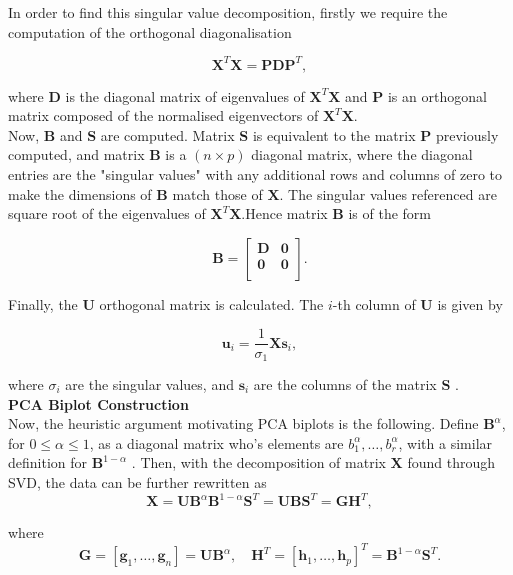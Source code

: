 \documentclass{article}\usepackage[]{graphicx}\usepackage[]{xcolor}
\numberwithin{equation}{section}
\begin{document}
\noindent In order to find this singular value decomposition, firstly we require the computation of the orthogonal diagonalisation  

\[
\mathbf{X}^T\mathbf{X}=\mathbf{PDP}^T,
\] 

\noindent where $\mathbf{D}$ is the diagonal matrix of eigenvalues of $\mathbf{X}^T\mathbf{X}$ and $\mathbf{P}$ is an orthogonal matrix composed of the normalised eigenvectors of $\mathbf{X}^T\mathbf{X}$.\\

\noindent Now, $\mathbf{B}$ and $\mathbf{S}$ are computed. Matrix $\mathbf{S}$ is equivalent to the matrix $\mathbf{P}$ previously computed, and matrix $\mathbf{B}$ is a $(n \times p)$ diagonal matrix, where the diagonal entries are the "singular values" with any additional rows and columns of zero to make the dimensions of $\mathbf{B}$ match those of $\mathbf{X}$. The singular values referenced are square root of the eigenvalues of $\mathbf{X}^T\mathbf{X}$.Hence matrix $\mathbf{B}$ is of the form

\[
\mathbf{B} = 
\begin{bmatrix}
    \mathbf{D} & \mathbf{0} \\
    \mathbf{0} & \mathbf{0} \\
\end{bmatrix}.
\]

\noindent Finally, the $\mathbf{U}$ orthogonal matrix is calculated. The $i$-th column of $\mathbf{U}$ is given by

\[
\mathbf{u}_i = \frac{1}{\sigma_1}\mathbf{X}\mathbf{s}_i,
\]

\noindent where $\sigma_i$ are the singular values, and $\mathbf{s}_i$ are the columns of the matrix $\mathbf{S}$ \cite{baker2005singular}.\\

\noindent \textbf{PCA Biplot Construction}\\
\noindent Now, the heuristic argument motivating PCA biplots is the following. Define $\mathbf{B}^{\alpha}$, for $0 \leq \alpha \leq 1$, as a diagonal matrix who's elements are $b_1^{\alpha}, \ldots, b_r^{\alpha}$, with a similar definition for $\mathbf{B}^{1-\alpha}$ \cite{biplotsnotes}. Then, with the decomposition of matrix $\mathbf{X}$ found through SVD, the data can be further rewritten as
\[\mathbf{X} = \mathbf{U}\mathbf{B}^{\alpha}\mathbf{B}^{1-\alpha}\mathbf{S}^{T} = \mathbf{U}\mathbf{B}\mathbf{S}^{T} = \mathbf{G}\mathbf{H}^{T},\]

\noindent where \[\mathbf{G} = [\mathbf{g}_1, \dots , \mathbf{g}_n] = \mathbf{U}\mathbf{B}^\alpha, \quad \mathbf{H}^T = [\mathbf{h}_1, \dots , \mathbf{h}_p]^T = \mathbf{B}^{1-\alpha}\mathbf{S}^T. \]
\end{document}
